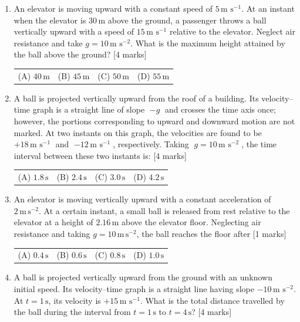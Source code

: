 \documentclass[11pt,a4paper]{article}
\begin{document}
\begin{enumerate}[resume]
\item An elevator is moving upward with a constant speed of \(5\,\text{m s}^{-1}\). At an instant when the elevator is \(30\,\text{m}\) above the ground, a passenger throws a ball vertically upward with a speed of \(15\,\text{m s}^{-1}\) relative to the elevator. Neglect air resistance and take \(g=10\,\text{m s}^{-2}\). What is the maximum height attained by the ball above the ground? \hfill [4 marks]
{\renewcommand{\arraystretch}{1.8}
\begin{tabularx}{\linewidth}{X X X X}
(A) \quad \(40\,\text{m}\) & (B) \quad \(45\,\text{m}\) & (C) \quad \(50\,\text{m}\) & (D) \quad \(55\,\text{m}\) \\[10pt]
\end{tabularx}}
\item A ball is projected vertically upward from the roof of a building. Its velocity--time graph is a straight line of slope $-g$ and crosses the time axis once; however, the portions corresponding to upward and downward motion are not marked. At two instants on this graph, the velocities are found to be $+18\,\text{m s}^{-1}$ and $-12\,\text{m s}^{-1}$, respectively. Taking $g=10\,\text{m s}^{-2}$, the time interval between these two instants is: \hfill [4 marks]
{\renewcommand{\arraystretch}{1.8}
\begin{tabularx}{\linewidth}{X X X X}
(A) \quad $1.8\,\text{s}$ & (B) \quad $2.4\,\text{s}$ & (C) \quad $3.0\,\text{s}$ & (D) \quad $4.2\,\text{s}$ \\[10pt]
\end{tabularx}}
\item An elevator is moving vertically upward with a constant acceleration of $2\,\mathrm{m\,s^{-2}}$. At a certain instant, a small ball is released from rest relative to the elevator at a height of $2.16\,\mathrm{m}$ above the elevator floor. Neglecting air resistance and taking $g=10\,\mathrm{m\,s^{-2}}$, the ball reaches the floor after \hfill [1 marks]
{\renewcommand{\arraystretch}{1.8}
\begin{tabularx}{\linewidth}{X X X X}
(A) \quad $0.4\,\mathrm{s}$ & (B) \quad $0.6\,\mathrm{s}$ & (C) \quad $0.8\,\mathrm{s}$ & (D) \quad $1.0\,\mathrm{s}$ \\[10pt]
\end{tabularx}}
\item A ball is projected vertically upward from the ground with an unknown initial speed. Its velocity–time graph is a straight line having slope $-10\,\text{m s}^{-2}$. At $t=1\,\text{s}$, its velocity is $+15\,\text{m s}^{-1}$. What is the total distance travelled by the ball during the interval from $t=1\,\text{s}$ to $t=4\,\text{s}$? \hfill [4 marks]

\end{enumerate}
\end{document}
